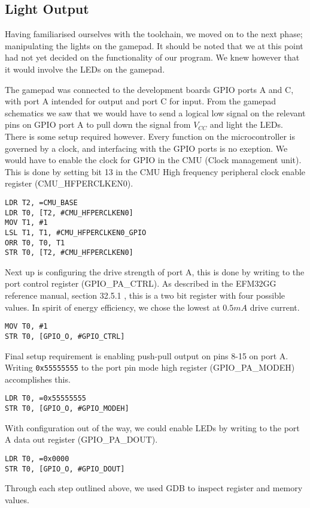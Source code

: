 \subsection{Light Output}
\label{sec:light-output}

Having familiarised ourselves with the toolchain, we moved on to the next phase; manipulating the lights on the gamepad. It should be noted that we at this point had not yet decided on the functionality of our program. We knew however that it would involve the LEDs on the gamepad.

The gamepad was connected to the development boards GPIO ports A and C, with port A intended for output and port C for input. From the gamepad schematics \cite[p.~26]{compendium} we saw that we would have to send a logical low signal on the relevant pins on GPIO port A to pull down the signal from $V_{CC}$ and light the LEDs. There is some setup required however. Every function on the microcontroller is governed by a clock, and interfacing with the GPIO ports is no exeption. We would have to enable the clock for GPIO in the CMU (Clock management unit). This is done by setting bit 13 in the CMU High frequency peripheral clock enable register (CMU\_HFPERCLKEN0).

\begin{lstlisting}[label=enable-gpio-clock,caption=Enabling GPIO clock in the CMU]
LDR T2, =CMU_BASE
LDR T0, [T2, #CMU_HFPERCLKEN0]
MOV T1, #1
LSL T1, T1, #CMU_HFPERCLKEN0_GPIO
ORR T0, T0, T1
STR T0, [T2, #CMU_HFPERCLKEN0]
\end{lstlisting}

Next up is configuring the drive strength of port A, this is done by writing to the port control register (GPIO\_PA\_CTRL). As described in the EFM32GG reference manual, section 32.5.1 \cite{efm32ggref}, this is a two bit register with four possible values. In spirit of energy efficiency, we chose the lowest at $0.5mA$ drive current.

\begin{lstlisting}[label=set-drive-strength, caption=Set drive strength]
MOV T0, #1
STR T0, [GPIO_O, #GPIO_CTRL]
\end{lstlisting}

Final setup requirement is enabling push-pull output on pins 8-15 on port A. Writing \texttt{0x55555555} to the port pin mode high register (GPIO\_PA\_MODEH) accomplishes this. \cite[p.~767]{efm32ggref}

\begin{lstlisting}[label=enable-gpio-output, caption=Enable output]
LDR T0, =0x55555555
STR T0, [GPIO_O, #GPIO_MODEH]
\end{lstlisting}

With configuration out of the way, we could enable LEDs by writing to the port A data out register (GPIO\_PA\_DOUT).

\begin{lstlisting}[label=enable-leds, caption=Enabling LEDs]
LDR T0, =0x0000
STR T0, [GPIO_O, #GPIO_DOUT]
\end{lstlisting}

Through each step outlined above, we used GDB to inspect register and memory values. 
